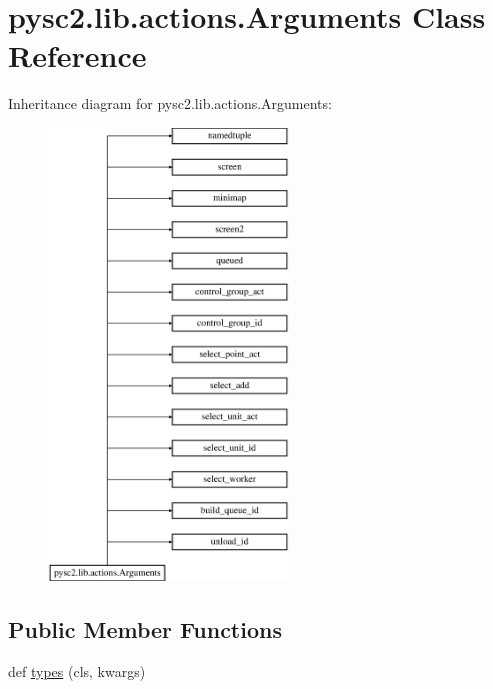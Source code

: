 \hypertarget{classpysc2_1_1lib_1_1actions_1_1_arguments}{}\section{pysc2.\+lib.\+actions.\+Arguments Class Reference}
\label{classpysc2_1_1lib_1_1actions_1_1_arguments}
Inheritance diagram for pysc2.\+lib.\+actions.\+Arguments\+:\begin{figure}[H]
\begin{center}
\leavevmode
\includegraphics[height=12.000000cm]{classpysc2_1_1lib_1_1actions_1_1_arguments}
\end{center}
\end{figure}
\subsection*{Public Member Functions}
\begin{DoxyCompactItemize}
\item 
def \mbox{\hyperlink{classpysc2_1_1lib_1_1actions_1_1_arguments_ab78c631c19bfc340e35069612a5b1f22}{types}} (cls, kwargs)
\end{DoxyCompactItemize}


